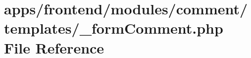 \hypertarget{frontend_2modules_2comment_2templates_2__form_comment_8php}{\section{apps/frontend/modules/comment/templates/\-\_\-form\-Comment.php File Reference}
\label{frontend_2modules_2comment_2templates_2__form_comment_8php}
}
